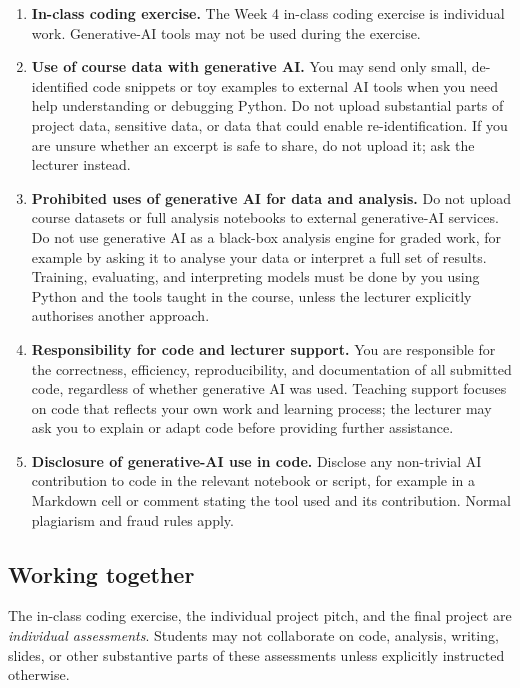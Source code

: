 \documentclass[a4paper,10pt,twocolumn]{report}
\begin{document}
\begin{enumerate}
    \item \textbf{In-class coding exercise.} The Week 4 in-class coding exercise is individual work. Generative-AI tools may not be used during the exercise.

    \item \textbf{Use of course data with generative AI.} You may send only small, de-identified code snippets or toy examples to external AI tools when you need help understanding or debugging Python. Do not upload substantial parts of project data, sensitive data, or data that could enable re-identification. If you are unsure whether an excerpt is safe to share, do not upload it; ask the lecturer instead.

    \item \textbf{Prohibited uses of generative AI for data and analysis.} Do not upload course datasets or full analysis notebooks to external generative-AI services. Do not use generative AI as a black-box analysis engine for graded work, for example by asking it to analyse your data or interpret a full set of results. Training, evaluating, and interpreting models must be done by you using Python and the tools taught in the course, unless the lecturer explicitly authorises another approach.

    \item \textbf{Responsibility for code and lecturer support.} You are responsible for the correctness, efficiency, reproducibility, and documentation of all submitted code, regardless of whether generative AI was used. Teaching support focuses on code that reflects your own work and learning process; the lecturer may ask you to explain or adapt code before providing further assistance.

    \item \textbf{Disclosure of generative-AI use in code.} Disclose any non-trivial AI contribution to code in the relevant notebook or script, for example in a Markdown cell or comment stating the tool used and its contribution. Normal plagiarism and fraud rules apply.
\end{enumerate}

\subsection{Working together}

The in-class coding exercise, the individual project pitch, and the final project are \emph{individual assessments}. Students may not collaborate on code, analysis, writing, slides, or other substantive parts of these assessments unless explicitly instructed otherwise.
\end{document}
